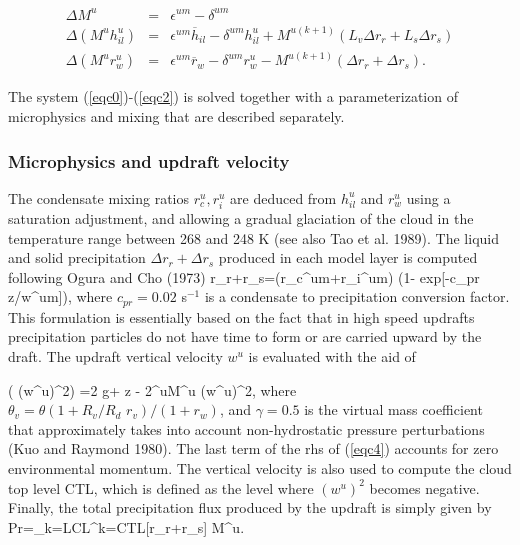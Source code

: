 \begin{eqnarray}
\Delta M^u&=&\epsilon^{um}-\delta^{um}\label{eqc0}\\
\Delta( M^u h_{il}^u)&=&\epsilon^{um}\overline{h}_{il}
-\delta^{um} h_{il}^{u} +M^{u(k+1)} (L_v \Delta r_r + L_s \Delta r_s)
\label{eqc1}\\
\Delta( M^u r_w^u)&=&\epsilon^{um}\overline{r}_w
-\delta^{um} r_w^{u}- M^{u(k+1)} (\Delta r_r + \Delta r_s).
\label{eqc2}
\end{eqnarray}

\noindent
The system (\ref{eqc0})-(\ref{eqc2}) is solved together with a
parameterization of microphysics and mixing that are described separately.

\subsubsection{Microphysics and updraft velocity}

The condensate mixing ratios  $r_c^u, r_i^u$ are deduced
from $h_{il}^u$ and $r_w^u$ using a saturation adjustment, and allowing
a gradual glaciation of the cloud in the temperature range between
268 and 248 K (see also Tao et al. 1989).
The liquid and solid precipitation
$\Delta r_r+\Delta r_s$ produced in each model layer is computed
 following Ogura and Cho (1973)
\beq
\Delta r_r+\Delta r_s=(r_c^{um}+r_i^{um}) (1- exp[-c_{pr} \Delta z/w^{um}]),
\label{eqPr}
\eeq
\noindent
where  $c_{pr}=0.02$ s$^{-1}$ is a condensate to precipitation
conversion factor. This formulation is essentially  based on the fact
that in high speed updrafts precipitation particles  do not have time to
form or are carried upward by the draft.
The updraft vertical velocity $w^u$ is evaluated with the aid of

\beq
\Delta( (w^u)^2) ={2 g+\gamma}
\Delta z - 2{\epsilon^u\over M^u} (w^u)^2,
\label{eqc4}
\eeq
\noindent
where  $\theta_v=\theta (1+R_v/R_d\,\,r_v)/(1+r_w)$, and
$\gamma=0.5$ is the virtual mass coefficient that
approximately takes into account non-hydrostatic pressure perturbations
(Kuo and Raymond 1980).
The last term of the rhs of
(\ref{eqc4}) accounts for zero environmental momentum.
The vertical velocity is  also used to compute the cloud top level CTL,
which is defined as the level where $(w^u)^2$ becomes negative.
Finally, the total
precipitation flux produced by the updraft is simply given by
\beq
{\rm Pr}=\sum_{k={\rm LCL}}^{k={\rm CTL}}[\Delta r_r+\Delta r_s] M^u.
\eeq


